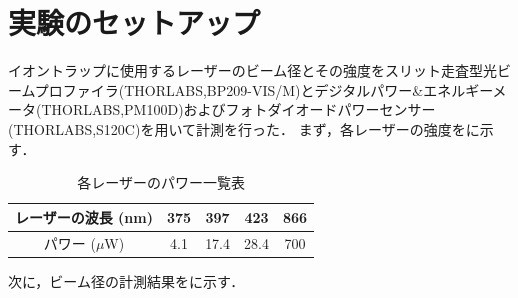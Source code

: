 \section{実験のセットアップ}

イオントラップに使用するレーザーのビーム径とその強度をスリット走査型光ビームプロファイラ(THORLABS,BP209-VIS/M)とデジタルパワー\&エネルギーメータ(THORLABS,PM100D)およびフォトダイオードパワーセンサー(THORLABS,S120C)を用いて計測を行った．
まず，各レーザーの強度をに示す．

\begin{table}[h]
	\begin{center}
		\caption{各レーザーのパワー一覧表}
		\label{tab:AllLaserPower}
		\begin{tabular}{c|cccc} \hline \hline
			レーザーの波長 (nm)&375&397&423&866 \\ \hline
			パワー ($\mu$W)&4.1&17.4&28.4&700 \\ \hline
		\end{tabular}
	\end{center}
\end{table}

次に，ビーム径の計測結果をに示す．

